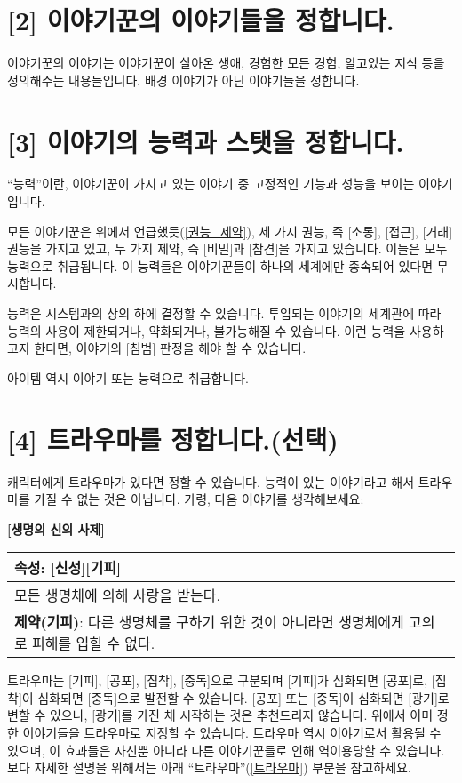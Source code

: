 \documentclass[12pt]{report}
\newenvironment{story}[2]
{\begin{center}
		{\large \textbf{[#1]}}\\[1ex]
		\begin{tabular}{|p{\textwidth}|}
			\hline
			\textbf{속성}: #2
			\\
			\hline
		}
		{ 
			\\\hline
		\end{tabular}
	\end{center}
}
\begin{document}
	\section*{[2] 이야기꾼의 이야기들을 정합니다.}
	이야기꾼의 이야기는 이야기꾼이 살아온 생애, 경험한 모든 경험, 알고있는 지식 등을 정의해주는 내용들입니다. 배경 이야기가 아닌 이야기들을 정합니다.
	
	\section*{[3] 이야기의 능력과 스탯을 정합니다.}
	“능력”이란, 이야기꾼이 가지고 있는 이야기 중 고정적인 기능과 성능을 보이는 이야기입니다.
	
	모든 이야기꾼은 위에서 언급했듯(\ref{권능_제약}), 세 가지 권능, 즉 [소통], [접근], [거래] 권능을 가지고 있고, 두 가지 제약, 즉 [비밀]과 [참견]을 가지고 있습니다. 이들은 모두 능력으로 취급됩니다. 이 능력들은 이야기꾼들이 하나의 세계에만 종속되어 있다면 무시합니다.
	
	능력은 시스템과의 상의 하에 결정할 수 있습니다. 투입되는 이야기의 세계관에 따라 능력의 사용이 제한되거나, 약화되거나, 불가능해질 수 있습니다. 이런 능력을 사용하고자 한다면, 이야기의 [침범] 판정을 해야 할 수 있습니다.
	
	아이템 역시 이야기 또는 능력으로 취급합니다.
	
	\section*{[4] 트라우마를 정합니다.(선택)}
	캐릭터에게 트라우마가 있다면 정할 수 있습니다. 능력이 있는 이야기라고 해서 트라우마를 가질 수 없는 것은 아닙니다. 가령, 다음 이야기를 생각해보세요:
	
	\begin{story}{생명의 신의 사제}{[신성][기피]}
		모든 생명체에 의해 사랑을 받는다.
		\\
		\textbf{제약(기피)}: 다른 생명체를 구하기 위한 것이 아니라면 생명체에게 고의로 피해를 입힐 수 없다.
	\end{story}
	
	트라우마는 [기피], [공포], [집착], [중독]으로 구분되며 [기피]가 심화되면 [공포]로, [집착]이 심화되면 [중독]으로 발전할 수 있습니다. [공포] 또는 [중독]이 심화되면 [광기]로 변할 수 있으나, [광기]를 가진 채 시작하는 것은 추천드리지 않습니다. 위에서 이미 정한 이야기들을 트라우마로 지정할 수 있습니다. 트라우마 역시 이야기로서 활용될 수 있으며, 이 효과들은 자신뿐 아니라 다른 이야기꾼들로 인해 역이용당할 수 있습니다. 보다 자세한 설명을 위해서는 아래 “트라우마”(\ref{트라우마}) 부분을 참고하세요.
	
\end{document}
